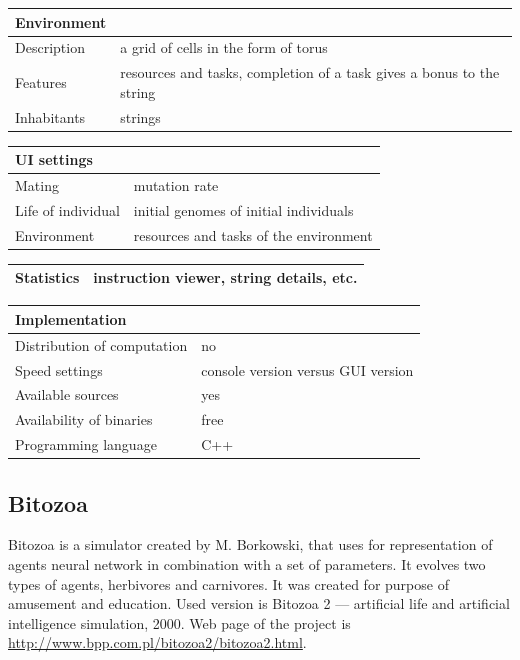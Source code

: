 \documentclass[a4paper,12pt]{report}
\begin{document}
\vspace{10pt}
\begin{tabular}{|p{150pt}|p{220pt}|} 
\hline 
\textbf{Environment}& \\ \hline
Description&a grid of cells in the form of torus \\ \hline
Features&resources and tasks, completion of a task gives a bonus to the string \\ \hline
Inhabitants&strings \\ \hline 
\end{tabular} 

\vspace{10pt}
\begin{tabular} {|p{150pt}|p{220pt}|}\hline \textbf{UI settings}& \\ \hline
Mating&mutation rate \\ \hline
Life of individual&initial genomes of initial individuals \\ \hline
Environment&resources and tasks of the environment \\ \hline 
\end{tabular} 

\vspace{10pt}
\begin{tabular} {|p{150pt}|p{220pt}|}\hline \textbf{Statistics}&instruction viewer, string details, etc. \\ \hline
\end{tabular} 

\vspace{10pt}
\begin{tabular}{|p{150pt}|p{220pt}|} \hline \textbf{Implementation}& \\ \hline
Distribution of computation&no \\ \hline
Speed settings&console version versus GUI version  \\ \hline
Available sources&yes \\ \hline
Availability of binaries&free \\ \hline
Programming language&C++ \\ \hline
\end{tabular}


\subsection {Bitozoa}
Bitozoa is a simulator created by M. Borkowski, that uses for representation of agents neural network in combination with a set of parameters. It evolves two types of agents, herbivores and carnivores. It was created for purpose of amusement and education. Used version is Bitozoa 2 --- artificial life and artificial intelligence simulation, 2000. Web page of the project is \url{http://www.bpp.com.pl/bitozoa2/bitozoa2.html}.
\end{document}
